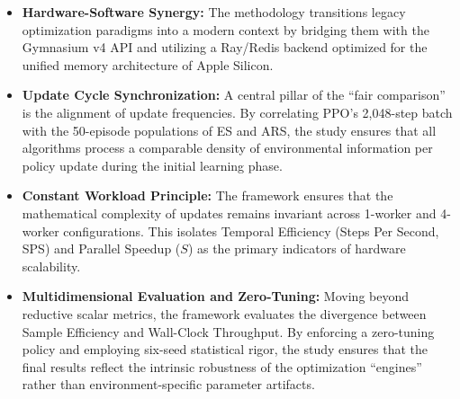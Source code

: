 \begin{itemize}
    \item \textbf{Hardware-Software Synergy:} The methodology transitions legacy optimization paradigms into a modern context by bridging them with the Gymnasium v4 API and utilizing a Ray/Redis backend optimized for the unified memory architecture of Apple Silicon.

    \item \textbf{Update Cycle Synchronization:} A central pillar of the ``fair comparison'' is the alignment of update frequencies. By correlating PPO’s 2,048-step batch with the 50-episode populations of ES and ARS, the study ensures that all algorithms process a comparable density of environmental information per policy update during the initial learning phase.

    \item \textbf{Constant Workload Principle:} The framework ensures that the mathematical complexity of updates remains invariant across 1-worker and 4-worker configurations. This isolates Temporal Efficiency (Steps Per Second, SPS) and Parallel Speedup ($S$) as the primary indicators of hardware scalability.

    \item \textbf{Multidimensional Evaluation and Zero-Tuning:} Moving beyond reductive scalar metrics, the framework evaluates the divergence between Sample Efficiency and Wall-Clock Throughput. By enforcing a zero-tuning policy and employing six-seed statistical rigor, the study ensures that the final results reflect the intrinsic robustness of the optimization ``engines'' rather than environment-specific parameter artifacts.
\end{itemize}

\clearpage
\null %
\clearpage